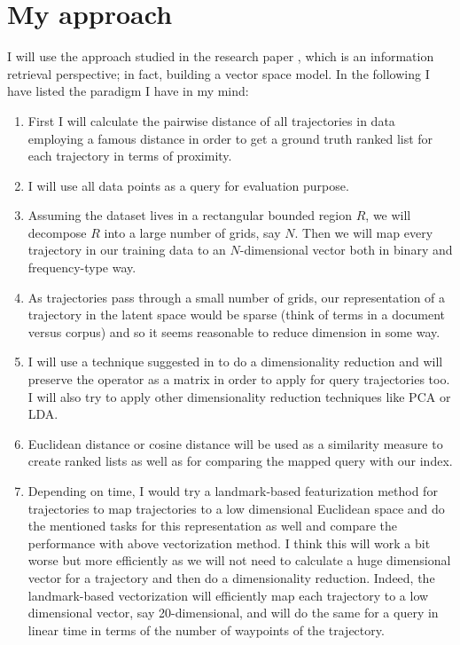 \documentclass[10pt, twocolumn]{myclass}
\begin{document}
\section{My approach}

I will use the approach studied in the research paper \cite{pap2008}, which is an information retrieval perspective; in fact, building a vector space model. In the following I have listed the paradigm I have in my mind:
\begin{enumerate}
\item 
First I will calculate the pairwise distance of all trajectories in data employing a famous distance in order to get a ground truth ranked list for each trajectory in terms of proximity. \vspace{-1mm}
\item 
I will use all data points as a query for evaluation purpose. \vspace{-1mm}
\item
Assuming the dataset lives in a rectangular bounded region $R$, we will decompose $R$ into a large number of grids, say $N$. Then we will map every trajectory in our training data to an $N$-dimensional vector both in binary and frequency-type way. \vspace{-1mm}
\item 
As trajectories pass through a small number of grids, our representation of a trajectory in the latent space would be sparse (think of terms in a document versus corpus) and so it seems reasonable to reduce dimension in some way. \vspace{-1mm}
\item 
I will use a technique suggested in \cite{pap2008} to do a dimensionality reduction and will preserve the operator as a matrix in order to apply for query trajectories too. I will also try to apply other dimensionality reduction techniques like PCA or LDA. \vspace{-1mm}
\item
Euclidean distance or cosine distance will be used as a similarity measure to create ranked lists as well as for comparing the mapped query with our index.  \vspace{-1mm}
\item
Depending on time, I would try a landmark-based featurization method for trajectories to map trajectories to a low dimensional Euclidean space and do the mentioned tasks for this representation as well and compare the performance with above vectorization method. I think this will work a bit worse but more efficiently as we will not need to calculate a huge dimensional vector for a trajectory and then do a dimensionality reduction. Indeed, the landmark-based vectorization will efficiently map each trajectory to a low dimensional vector, say 20-dimensional, and will do the same for a query in linear time in terms of the number of waypoints of the trajectory. 
\end{enumerate}
\end{document}
